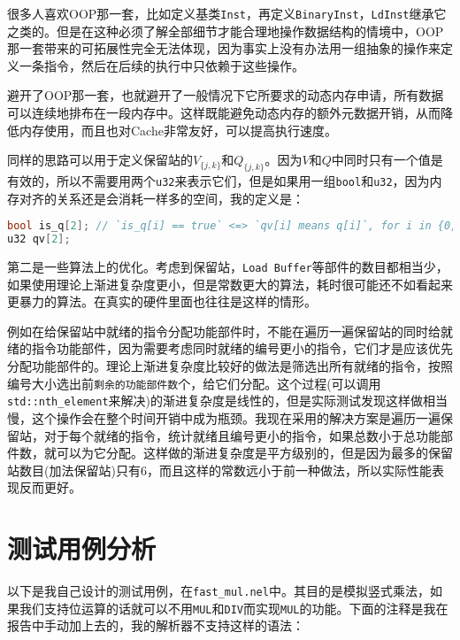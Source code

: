 \documentclass[12pt, UTF8]{article}
\begin{document}
很多人喜欢OOP那一套，比如定义基类\lstinline|Inst|，再定义\lstinline|BinaryInst|，\lstinline|LdInst|继承它之类的。但是在这种必须了解全部细节才能合理地操作数据结构的情境中，OOP那一套带来的可拓展性完全无法体现，因为事实上没有办法用一组抽象的操作来定义一条指令，然后在后续的执行中只依赖于这些操作。

避开了OOP那一套，也就避开了一般情况下它所要求的动态内存申请，所有数据可以连续地排布在一段内存中。这样既能避免动态内存的额外元数据开销，从而降低内存使用，而且也对Cache非常友好，可以提高执行速度。

同样的思路可以用于定义保留站的$V_{\{j, k\}}$和$Q_{\{j, k\}}$。因为$V$和$Q$中同时只有一个值是有效的，所以不需要用两个\lstinline|u32|来表示它们，但是如果用一组\lstinline|bool|和\lstinline|u32|，因为内存对齐的关系还是会消耗一样多的空间，我的定义是：

\begin{lstlisting}[language = C++, morekeywords = { u32 }]
bool is_q[2]; // `is_q[i] == true` <=> `qv[i] means q[i]`, for i in {0, 1}
u32 qv[2];
\end{lstlisting}

第二是一些算法上的优化。考虑到保留站，\lstinline|Load Buffer|等部件的数目都相当少，如果使用理论上渐进复杂度更小，但是常数更大的算法，耗时很可能还不如看起来更暴力的算法。在真实的硬件里面也往往是这样的情形。

例如在给保留站中就绪的指令分配功能部件时，不能在遍历一遍保留站的同时给就绪的指令功能部件，因为需要考虑同时就绪的编号更小的指令，它们才是应该优先分配功能部件的。理论上渐进复杂度比较好的做法是筛选出所有就绪的指令，按照编号大小选出前\lstinline|剩余的功能部件数|个，给它们分配。这个过程(可以调用\lstinline|std::nth_element|来解决)的渐进复杂度是线性的，但是实际测试发现这样做相当慢，这个操作会在整个时间开销中成为瓶颈。我现在采用的解决方案是遍历一遍保留站，对于每个就绪的指令，统计就绪且编号更小的指令，如果总数小于总功能部件数，就可以为它分配。这样做的渐进复杂度是平方级别的，但是因为最多的保留站数目(加法保留站)只有6，而且这样的常数远小于前一种做法，所以实际性能表现反而更好。

\section{测试用例分析}

以下是我自己设计的测试用例，在\lstinline|fast_mul.nel|中。其目的是模拟竖式乘法，如果我们支持位运算的话就可以不用\lstinline|MUL|和\lstinline|DIV|而实现\lstinline|MUL|的功能。下面的注释是我在报告中手动加上去的，我的解析器不支持这样的语法：
\end{document}
